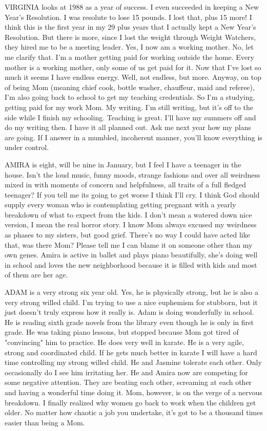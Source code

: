VIRGINIA looks at 1988 as a year of success. I even succeeded in keeping a New Year's Resolution. I was resolute to lose 15 pounds. I lost that,
plus 15 more! I think this is the first year in my 29 plus years that I actually kept a New Year's Resolution. But there is more, since I lost
the weight through Weight Watchers, they hired me to be a meeting leader. Yes, I now am a working mother. No, let me clarify that. I'm a mother
getting paid for working outside the home. Every mother is a working mother, only some of us get paid for it. Now that I've lost so much it
seems I have endless energy. Well, not endless, but more. Anyway, on top of being Mom (meaning chief cook, bottle washer, chauffeur, maid and
referee), I'm also going back to school to get my teaching credentials. So I'm a studying, getting paid for my work Mom. My writing. I'm still
writing, but it's off to the side while I finish my schooling. Teaching is great. I'll have my summers off and do my writing then. I have it all
planned out. Ask me next year how my plans are going. If I answer in a mumbled, incoherent manner, you'll know everything is under control.

AMIRA   is   eight,   will   be nine   in   January,   but   I   feel   I   have   a   teenager   in   the house.         Isn't    the    loud
music,    funny    moods,    strange    fashions    and    over    all weirdness    mixed    in    with    moments    of    concern    and
helpfulness,    all    traits    of    a full fledged teenager? If you tell me its going to get worse I think I'll cry. I think God should
supply every woman who is contemplating getting pregnant with a yearly breakdown of what to expect from the kids. I don't mean a watered down
nice version, I mean the real horror story. I know Mom always excused my weirdness as phases to my sisters, but good grief. There's no way I
could have acted like that, was there Mom? Please tell me I can blame it on someone other than my own genes. Amira is active in ballet and plays
piano beautifully, she's doing well in school and loves the new neighborhood because it is filled with kids and most of them are her age.

ADAM is a very strong six year old. Yes, he is physically strong, but he is also a very strong willed child. I'm trying to use a nice euphemism
for stubborn, but it just doesn't truly express how it really is. Adam is doing wonderfully in school. He is reading sixth grade novels from the
library even though he is only in first grade. He was taking piano lessons, but stopped because Mom got tired of "convincing" him to practice.
He does very well in karate. He is a very agile, strong and coordinated child. If he gets much better in karate I will have a hard time
controlling my strong willed child. He and Jasmine tolerate each other. Only occasionally do I see him irritating her. He and Amira now are
competing for some negative attention. They are beating each other, screaming at each other and having a wonderful time doing it. Mom, however,
is on the verge of a nervous breakdown. I finally realized why women go back to work when the children get older. No matter how chaotic a job
you undertake, it's got to be a thousand times easier than being a Mom.

